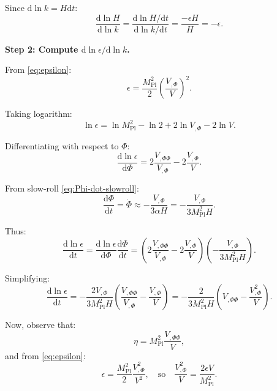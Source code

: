 \documentclass[11pt,a4paper]{article}
\numberwithin{equation}{section}
\theoremstyle{plain}
\theoremstyle{definition}
\theoremstyle{remark}
\newcommand{\dd}{\mathrm{d}}
\begin{document}
Since $\dd\ln k = H\dd t$:
\begin{equation}
\frac{\dd\ln H}{\dd\ln k} = \frac{\dd\ln H/\dd t}{\dd\ln k/\dd t} = \frac{-\epsilon H}{H} = -\epsilon.
\label{eq:dlnH-dlnk}
\end{equation}

\textbf{Step 2: Compute $\dd\ln\epsilon/\dd\ln k$.}

From \eqref{eq:epsilon}:
\begin{equation}
\epsilon = \frac{M_{\mathrm{Pl}}^2}{2}\left(\frac{V_{,\Phi}}{V}\right)^2.
\end{equation}

Taking logarithm:
\begin{equation}
\ln\epsilon = \ln M_{\mathrm{Pl}}^2 - \ln 2 + 2\ln V_{,\Phi} - 2\ln V.
\end{equation}

Differentiating with respect to $\Phi$:
\begin{equation}
\frac{\dd\ln\epsilon}{\dd\Phi} = 2\frac{V_{,\Phi\Phi}}{V_{,\Phi}} - 2\frac{V_{,\Phi}}{V}.
\end{equation}

From slow-roll \eqref{eq:Phi-dot-slowroll}:
\begin{equation}
\frac{\dd\Phi}{\dd t} = \dot{\Phi} \approx -\frac{V_{,\Phi}}{3\alpha H} = -\frac{V_{,\Phi}}{3M_{\mathrm{Pl}}^2 H}.
\end{equation}

Thus:
\begin{equation}
\frac{\dd\ln\epsilon}{\dd t} = \frac{\dd\ln\epsilon}{\dd\Phi}\frac{\dd\Phi}{\dd t} = \left(2\frac{V_{,\Phi\Phi}}{V_{,\Phi}} - 2\frac{V_{,\Phi}}{V}\right)\left(-\frac{V_{,\Phi}}{3M_{\mathrm{Pl}}^2 H}\right).
\end{equation}

Simplifying:
\begin{equation}
\frac{\dd\ln\epsilon}{\dd t} = -\frac{2V_{,\Phi}}{3M_{\mathrm{Pl}}^2 H}\left(\frac{V_{,\Phi\Phi}}{V_{,\Phi}} - \frac{V_{,\Phi}}{V}\right) = -\frac{2}{3M_{\mathrm{Pl}}^2 H}\left(V_{,\Phi\Phi} - \frac{V_{,\Phi}^2}{V}\right).
\end{equation}

Now, observe that:
\begin{equation}
\eta = M_{\mathrm{Pl}}^2\frac{V_{,\Phi\Phi}}{V},
\end{equation}
and from \eqref{eq:epsilon}:
\begin{equation}
\epsilon = \frac{M_{\mathrm{Pl}}^2}{2}\frac{V_{,\Phi}^2}{V^2},\quad\text{so}\quad\frac{V_{,\Phi}^2}{V} = \frac{2\epsilon V}{M_{\mathrm{Pl}}^2}.
\end{equation}
\end{document}

